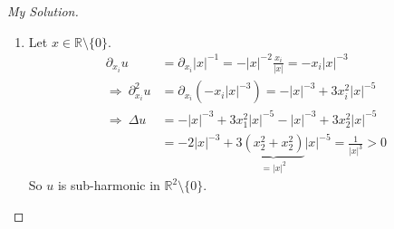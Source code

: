 \documentclass{report}
\theoremstyle{tommy}
\begin{document}
  \begin{proof}[My Solution]
    \begin{enumerate}[label=\alph*)]
      \item Let \(x \in \mathbb{R} \setminus \{0\}\).
      \begin{align*}
        \partial_{x_i} u &= \partial_{x_i} |x|^{-1} = - |x|^{-2} \frac{x_i}{|x|} = -x_i |x|^{-3} \\
        \Rightarrow \ \partial_{x_i}^2 u &= \partial_{x_i} (-x_i |x|^{-3}) = -|x|^{-3} + 3x_i^2 |x|^{-5} \\
        \Rightarrow \ \Delta u &= - |x|^{-3} + 3x_1^2 |x|^{-5} - |x|^{-3} + 3x_2^2 |x|^{-5} \\
        &= - 2 |x|^{-3} + 3 \underbrace{(x_2^2 + x_2^2)}_{= |x|^2} |x|^{-5} = \frac{1}{|x|^3} > 0
      \end{align*}
      So \(u\) is sub-harmonic in \(\mathbb{R}^2\setminus \{0\}\).


\end{enumerate}
\end{proof}
\end{document}
